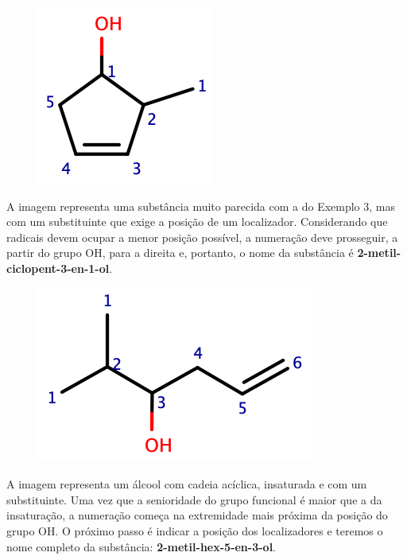 \begin{tcolorbox}[colback=white!5!white,colframe=orange!90!black,title=\textbf{Exemplo 4}]
	\begin{figure}[h]
		\centering
		\includegraphics[width=0.3\linewidth]{imagens/metilcpd.png}
		\label{fig:metilcpd}
	\end{figure}
	\tcblower
	A imagem representa uma substância muito parecida com a do Exemplo 3, mas com um substituinte que exige a posição de um localizador. Considerando que radicais devem ocupar a menor posição possível, a numeração deve prosseguir, a partir do grupo OH, para a direita e, portanto, o nome da substância é \textbf{2-metil-ciclopent-3-en-1-ol}.
\end{tcolorbox}

\begin{tcolorbox}[colback=white!5!white,colframe=orange!90!black,title=\textbf{Exemplo 5}]
	\begin{figure}[h]
		\centering
		\includegraphics[width=0.5\linewidth]{imagens/2metilhex.png}
		\label{fig:2metilhex}
	\end{figure}
	\tcblower
	A imagem representa um álcool com cadeia acíclica, insaturada e com um substituinte. Uma vez que a senioridade do grupo funcional é maior que a da insaturação, a numeração começa na extremidade mais próxima da posição do grupo OH. O próximo passo é indicar a posição dos localizadores e teremos o nome completo da substância: \textbf{2-metil-hex-5-en-3-ol}.
\end{tcolorbox}

